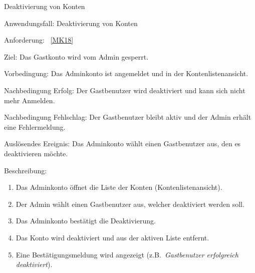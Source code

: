 \begin{function}{60}{Deaktivierung von Konten}
    \item[Anwendungsfall:] Deaktivierung von Konten
    \item[Anforderung:] ~\ref{MK18}
    \item[Ziel:] Das Gastkonto wird vom Admin gesperrt.
    \item[Vorbedingung:] Das Adminkonto ist angemeldet und in der Kontenlistenansicht.
    \item[Nachbedingung Erfolg:] Der Gastbenutzer wird deaktiviert und kann sich nicht mehr Anmelden.
    \item[Nachbedingung Fehlschlag:] Der Gastbenutzer bleibt aktiv und der Admin erhält eine Fehlermeldung.
    \item[Auslösendes Ereignis:] Das Adminkonto wählt einen Gastbenutzer aus, den es deaktivieren möchte.
    \item[Beschreibung:] ~
    \begin{enumerate}
        \item Das Adminkonto öffnet die Liste der Konten (Kontenlistenansicht).
        \item Der Admin wählt einen Gastbenutzer aus, welcher deaktiviert werden soll.
        \item Das Adminkonto bestätigt die Deaktivierung.
        \item Das Konto wird deaktiviert und aus der aktiven Liste entfernt.
        \item Eine Bestätigungsmeldung wird angezeigt (z.B.\ \textit{Gastbenutzer erfolgreich deaktiviert}).
    \end{enumerate}
\end{function}

\pagebreak

